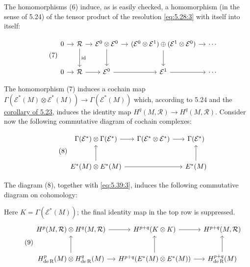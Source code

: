 The homomorphisms (6) induce, as is easily checked, a homomorphism (in the sense of 5.24) of the tensor product of the resolution \eqref{eq:5.28:3} with itself into itself:

\begin{equation}
\tag{7}\label{eq:5.43:7}
\begin{tikzcd}[ampersand replacement=\&,column sep=1em,row sep=2.3em]
0\arrow[r] \& \mathcal R\arrow[r]\arrow[d,"{\mathrm{id}}"] \&
\mathcal E^0\otimes\mathcal E^0\arrow[r]\arrow[d] \&
(\mathcal E^0\otimes\mathcal E^1)\oplus(\mathcal E^1\otimes\mathcal E^0)\arrow[r]\arrow[d] \& \cdots\\
0\arrow[r] \& \mathcal R\arrow[r] \& \mathcal E^0\arrow[r] \& \mathcal E^1\arrow[r] \& \cdots
\end{tikzcd}
\end{equation}

The homomorphism (7) induces a cochain map $\Gamma(\mathcal{E}^*(M)\otimes\mathcal{E}^*(M))\to\Gamma(\mathcal{E}^*(M))$ which, according to 5.24 and the \hyperref[thm:5.23]{corollary of 5.23}, induces the identity map $H^q(M,\mathcal{R})\to H^q(M,\mathcal{R})$. Consider now the following commutative diagram of cochain complexes:

\begin{equation}
\tag{8}\label{eq:5.43:8}
\begin{tikzcd}[ampersand replacement=\&,column sep=1.4em,row sep=2.3em]
\Gamma(\mathcal E^*)\otimes\Gamma(\mathcal E^*)\arrow[r] \&
\Gamma(\mathcal E^*\otimes\mathcal E^*)\arrow[r] \& \Gamma(\mathcal E^*)\\
E^*(M)\otimes E^*(M)\arrow[u]\arrow[rr] \& \& E^*(M)\arrow[u]
\end{tikzcd}
\end{equation}

The diagram (8), together with \eqref{eq:5.39:3}, induces the following commutative diagram on cohomology:

Here $K=\Gamma(\mathcal E^*(M))$; the final identity map in the top row is suppressed.
\begin{equation}
\tag{9}\label{eq:5.43:9}
\begin{tikzcd}[ampersand replacement=\&, column sep=1em,row sep=2.4em]
H^p(M,\mathcal R)\otimes H^q(M,\mathcal R) \arrow[r] \& H^{p+q}(K\otimes K) \arrow[r] \& H^{p+q}(M,\mathcal R) \\
H_{\mathrm{de\,R}}^p(M)\otimes H_{\mathrm{de\,R}}^q(M) \arrow[r] \arrow[u] \& H^{p+q}(E^*(M)\otimes E^*(M)) \arrow[r] \arrow[u] \& H_{\mathrm{de\,R}}^{p+q}(M) \arrow[u]
\end{tikzcd}
\end{equation}

